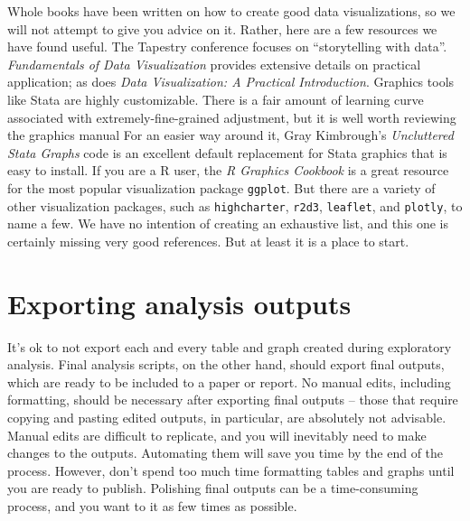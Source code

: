 Whole books have been written on how to create good data visualizations,
so we will not attempt to give you advice on it.
Rather, here are a few resources we have found useful.
The Tapestry conference focuses on ``storytelling with data''.
\textit{Fundamentals of Data Visualization} provides extensive details on practical application;
as does \textit{Data Visualization: A Practical Introduction}.
Graphics tools like Stata are highly customizable.
There is a fair amount of learning curve associated with extremely-fine-grained adjustment,
but it is well worth reviewing the graphics manual
For an easier way around it, Gray Kimbrough's \textit{Uncluttered Stata Graphs} code is an excellent default replacement for Stata graphics that is easy to install.
If you are a R user, the \textit{R Graphics Cookbook} 
is a great resource for the most popular visualization package \texttt{ggplot}. 
But there are a variety of other visualization packages, 
such as \texttt{highcharter}, 
\texttt{r2d3}, 
\texttt{leaflet}, 
and \texttt{plotly}, to name a few.
We have no intention of creating an exhaustive list, and this one is certainly missing very good references.
But at least it is a place to start.

\section{Exporting analysis outputs}

It's ok to not export each and every table and graph created during exploratory analysis. 
Final analysis scripts, on the other hand, should export final outputs, which are ready to be included to a paper or report.
No manual edits, including formatting, should be necessary after exporting final outputs -- 
those that require copying and pasting edited outputs, in particular, are absolutely not advisable. 
Manual edits are difficult to replicate, and you will inevitably need to make changes to the outputs. 
Automating them will save you time by the end of the process. 
However, don't spend too much time formatting tables and graphs until you are ready to publish.
Polishing final outputs can be a time-consuming process, 
and you want to it as few times as possible.

